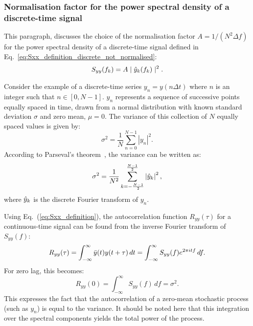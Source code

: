 \subsubsection*{Normalisation factor for the power spectral density of a discrete-time signal}\label{appendix_dft_normalisation}
This paragraph, discusses the choice of the normalisation factor $A=1/(N^2 \Delta f)$ for the power spectral density of a discrete-time signal defined in Eq.~\eqref{eq:Sxx_definition_discrete_not_normalised}:
\begin{equation}
S_{yy}(f_k) = A \mid \hat{y}_k(f_k) \mid ^2.
\end{equation}

Consider the example of a discrete-time series $y_n = y(n\Delta t)$ where $n$ is an integer such that $n \in [0, N-1]$. $y_n$ represents a sequence of successive points equally spaced in time, drawn from a normal distribution with known standard deviation $\sigma$ and zero mean, $\mu=0$. The variance of this collection of $N$ equally spaced values is given by:
\begin{equation}\label{eq:variance}
    \sigma^2 = \frac{1}{N}\sum_{n=0}^{N-1} \left | y_n \right |^2.
\end{equation}
According to Parseval's theorem~\cite{FFT_and_applications}, the variance can be written as:
\begin{equation}\label{eq:variance_2}
    \sigma^2 = \frac{1}{N^2}\sum_{k=-\frac{N-1}{2}}^{\frac{N-1}{2}} \left | \hat{y}_k \right |^2,
\end{equation}
where $\hat{y}_k$ is the discrete Fourier transform of $y_n$.

Using Eq.~(\ref{eq:Sxx_definition}), the autocorrelation function $R_{yy}(\tau)$ for a continuous-time signal can be found from the inverse Fourier transform of $S_{yy}(f)$:
\begin{equation}\label{eq:autocorrelation_ivnerse}
R_{yy}(\tau) = \int_{-\infty}^{\infty} \bar{y}(t) y(t+\tau) \, dt = \int_{-\infty}^{\infty} S_{yy}(f) e^{2\pi {i} t f} \, df.
\end{equation}
For zero lag, this becomes:
\begin{equation}\label{eq:autocorrelation_zero_lag}
R_{yy}(0) = \int_{-\infty}^{\infty} S_{yy}(f) \, df = \sigma^2.
\end{equation}
This expresses the fact that the autocorrelation of a zero-mean stochastic process (such as $y_n$) is equal to the variance. It should be noted here that this integration over the spectral components yields the total power of the process.

